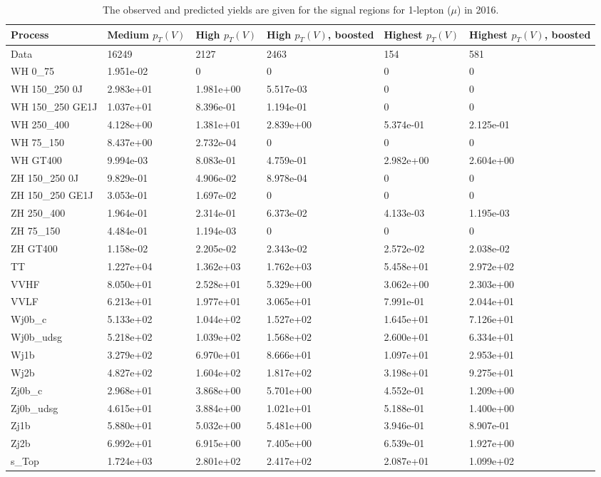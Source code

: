 \begin{table}
\centering
\caption[2016 1-lepton ($\mu$) signal selection yields]{
                  The observed and predicted yields are given for the
                  signal regions for 1-lepton ($\mu$) in 2016.
                  }
{\footnotesize
\begin{tabularx}{\textwidth}{|X|X|X|X|X|X|}
\hline
Process & Medium $p_{T}(V)$ & High $p_{T}(V)$ & High $p_{T}(V)$, boosted & Highest $p_{T}(V)$ & Highest $p_{T}(V)$, boosted \\
\hline
Data & 16249 & 2127 & 2463 & 154 & 581 \\
\hline
WH 0\_75 & 1.951e-02 & 0 & 0 & 0 & 0 \\
WH 150\_250 0J & 2.983e+01 & 1.981e+00 & 5.517e-03 & 0 & 0 \\
WH 150\_250 GE1J & 1.037e+01 & 8.396e-01 & 1.194e-01 & 0 & 0 \\
WH 250\_400 & 4.128e+00 & 1.381e+01 & 2.839e+00 & 5.374e-01 & 2.125e-01 \\
WH 75\_150 & 8.437e+00 & 2.732e-04 & 0 & 0 & 0 \\
WH GT400 & 9.994e-03 & 8.083e-01 & 4.759e-01 & 2.982e+00 & 2.604e+00 \\
ZH 150\_250 0J & 9.829e-01 & 4.906e-02 & 8.978e-04 & 0 & 0 \\
ZH 150\_250 GE1J & 3.053e-01 & 1.697e-02 & 0 & 0 & 0 \\
ZH 250\_400 & 1.964e-01 & 2.314e-01 & 6.373e-02 & 4.133e-03 & 1.195e-03 \\
ZH 75\_150 & 4.484e-01 & 1.194e-03 & 0 & 0 & 0 \\
ZH GT400 & 1.158e-02 & 2.205e-02 & 2.343e-02 & 2.572e-02 & 2.038e-02 \\
\hline
TT & 1.227e+04 & 1.362e+03 & 1.762e+03 & 5.458e+01 & 2.972e+02 \\
VVHF & 8.050e+01 & 2.528e+01 & 5.329e+00 & 3.062e+00 & 2.303e+00 \\
VVLF & 6.213e+01 & 1.977e+01 & 3.065e+01 & 7.991e-01 & 2.044e+01 \\
Wj0b\_c & 5.133e+02 & 1.044e+02 & 1.527e+02 & 1.645e+01 & 7.126e+01 \\
Wj0b\_udsg & 5.218e+02 & 1.039e+02 & 1.568e+02 & 2.600e+01 & 6.334e+01 \\
Wj1b & 3.279e+02 & 6.970e+01 & 8.666e+01 & 1.097e+01 & 2.953e+01 \\
Wj2b & 4.827e+02 & 1.604e+02 & 1.817e+02 & 3.198e+01 & 9.275e+01 \\
Zj0b\_c & 2.968e+01 & 3.868e+00 & 5.701e+00 & 4.552e-01 & 1.209e+00 \\
Zj0b\_udsg & 4.615e+01 & 3.884e+00 & 1.021e+01 & 5.188e-01 & 1.400e+00 \\
Zj1b & 5.880e+01 & 5.032e+00 & 5.481e+00 & 3.946e-01 & 8.907e-01 \\
Zj2b & 6.992e+01 & 6.915e+00 & 7.405e+00 & 6.539e-01 & 1.927e+00 \\
s\_Top & 1.724e+03 & 2.801e+02 & 2.417e+02 & 2.087e+01 & 1.099e+02 \\
\hline
\end{tabularx}
}
\label{tab:sr-Wmn-2016}
\end{table}

